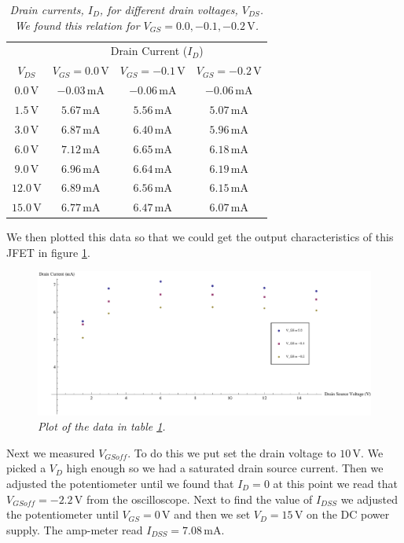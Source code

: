 \documentclass[11pt]{article}
\numberwithin{equation}{section}
\numberwithin{figure}{section}
\numberwithin{table}{section}
\newcommand{\unit}[1]{\ensuremath{\, \mathrm{#1}}}
\begin{document}
\begin{table}[h]
\centering
\begin{tabular}{c|ccc}
&\multicolumn{3}{c}{Drain Current ($I_D$)}\\
 $V_{DS}$	&$V_{GS} = 0.0\unit{V}$	&$V_{GS} = -0.1\unit{V}$	&$V_{GS} = -0.2\unit{V}$\\
\hline
$0.0\unit{V}$	&$-0.03\unit{mA}$	&$-0.06\unit{mA}$	&$-0.06\unit{mA}$\\
$1.5\unit{V}$	&$5.67\unit{mA}$	&$5.56\unit{mA}$	&$5.07\unit{mA}$\\
$3.0\unit{V}$	&$6.87\unit{mA}$	&$6.40\unit{mA}$	&$5.96\unit{mA}$\\
$6.0\unit{V}$	&$7.12\unit{mA}$	&$6.65\unit{mA}$	&$6.18\unit{mA}$\\
$9.0\unit{V}$	&$6.96\unit{mA}$	&$6.64\unit{mA}$	&$6.19\unit{mA}$\\
$12.0\unit{V}$	&$6.89\unit{mA}$	&$6.56\unit{mA}$	&$6.15\unit{mA}$\\
$15.0\unit{V}$	&$6.77\unit{mA}$	&$6.47\unit{mA}$	&$6.07\unit{mA}$\\
\end{tabular}
\caption{\textit{Drain currents, $I_D$, for different drain voltages, $V_{DS}$. We found this relation for $V_{GS}=0.0,-0.1,-0.2\unit{V}$.}}
\label{OutputData}
\end{table}
We then plotted this data so that we could get the output characteristics of this JFET in figure \ref{PlotJfetOutput}.
\begin{figure}[h]
\centering
\includegraphics[scale=0.70]{PlotJfetOutput.eps}
\caption{\textit{Plot of the data in table \ref{OutputData}.}}
\label{PlotJfetOutput}
\end{figure} 
Next we measured $V_{GSoff}$. To do this we put set the drain voltage to $10\unit{V}$. We picked a $V_D$ high enough so we had a saturated drain source current. Then we adjusted the potentiometer until we found that $I_D=0$ at this point we read that $V_{GSoff} = -2.2\unit{V}$ from the oscilloscope. Next to find the value of $I_{DSS}$ we adjusted the potentiometer until $V_{GS}=0\unit{V}$ and then we set $V_D=15\unit{V}$ on the DC power supply. The amp-meter read $I_{DSS}=7.08\unit{mA}$.
\end{document}

